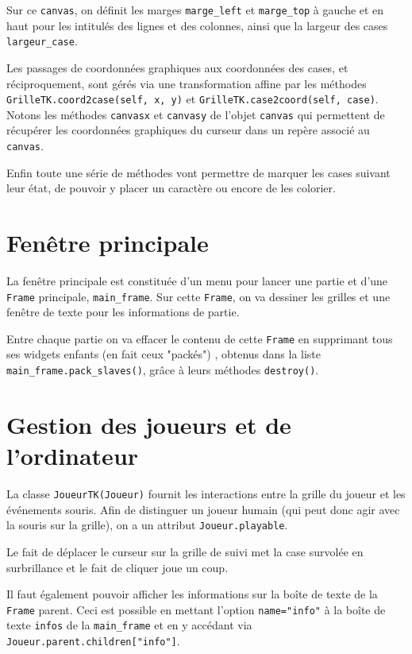 Sur ce \texttt{canvas}, on définit les marges \texttt{marge\_left} et \texttt{marge\_top} à gauche et en haut pour les intitulés des lignes et des colonnes, ainsi que la largeur des cases \texttt{largeur\_case}. 

\medskip

Les passages de coordonnées graphiques aux coordonnées des cases, et réciproquement, sont gérés via  une transformation affine par les méthodes \texttt{GrilleTK.coord2case(self, x, y)} et \texttt{GrilleTK.case2coord(self, case)}. Notons les méthodes \texttt{canvasx} et \texttt{canvasy} de l'objet \texttt{canvas} qui permettent de récupérer les coordonnées graphiques du curseur dans un repère associé au \texttt{canvas}.

\medskip

Enfin toute une série de méthodes vont permettre de marquer les cases suivant leur état, de pouvoir y placer un caractère ou encore de les colorier.

\section{Fenêtre principale}
La fenêtre principale est constituée d'un menu pour lancer une partie et d'une \texttt{Frame} principale, \texttt{main\_frame}. Sur cette \texttt{Frame}, on va dessiner les grilles et une fenêtre de texte pour les informations de partie.

\medskip

Entre chaque partie on va effacer le contenu de cette \texttt{Frame} en supprimant tous ses widgets enfants (en fait ceux "packés") , obtenus dans la liste \texttt{main\_frame.pack\_slaves()}, grâce à leurs méthodes \texttt{destroy()}. 

\section{Gestion des joueurs et de l'ordinateur}
La classe \texttt{JoueurTK(Joueur)} fournit les interactions entre la grille du joueur et les événements souris. Afin de distinguer un joueur humain (qui peut donc agir avec la souris sur la grille), on a un attribut \texttt{Joueur.playable}.

Le fait de déplacer le curseur sur la grille de suivi met la case survolée en surbrillance et le fait de cliquer joue un coup.

Il faut également pouvoir afficher les informations sur la boîte de texte de la \texttt{Frame} parent. Ceci est possible  en mettant l'option \texttt{name="info"} à la boîte de texte \texttt{infos} de la \texttt{main\_frame} et en y accédant via \texttt{Joueur.parent.children["info"]}.

